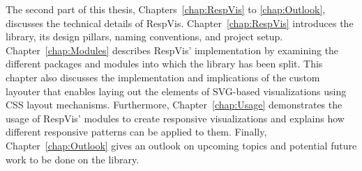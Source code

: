 The second part of this thesis, Chapters~\ref{chap:RespVis} to \ref{chap:Outlook}, discusses the technical details of RespVis. 
Chapter~\ref{chap:RespVis} introduces the library, its design pillars, naming conventions, and project setup.
Chapter~\ref{chap:Modules} describes RespVis' implementation by examining the different packages and modules into which the library has been split. 
This chapter also discusses the implementation and implications of the custom layouter that enables laying out the elements of SVG-based visualizations using CSS layout mechanisms.
Furthermore, Chapter~\ref{chap:Usage} demonstrates the usage of RespVis' modules to create responsive visualizations and explains how different responsive patterns can be applied to them.
Finally, Chapter~\ref{chap:Outlook} gives an outlook on upcoming topics and potential future work to be done on the library. 
